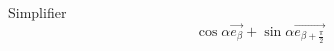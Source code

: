 Simplifier
\[\cos \alpha \overrightarrow{e_\beta}+\sin \alpha \overrightarrow{e_{\beta +\frac{\pi}{2}}}\]
\bigskip